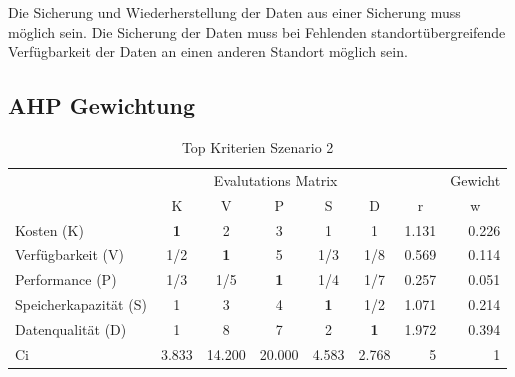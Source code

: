 Die Sicherung und Wiederherstellung der Daten aus einer Sicherung muss möglich sein. Die Sicherung der Daten muss bei Fehlenden standortübergreifende Verfügbarkeit der Daten an einen anderen Standort möglich sein.



\subsection{AHP Gewichtung}
\begin{table}[htbp]
\caption{Top Kriterien Szenario 2}
\begin{tabular}{|l|c|c|c|c|c|r|r|}
\hline
\multicolumn{ 1}{|c|}{} & \multicolumn{ 5}{c|}{Evalutations Matrix} & \multicolumn{1}{l|}{} & \multicolumn{1}{l|}{Gewicht} \\ \cline{ 2- 8}
\multicolumn{ 1}{|c|}{} & K & V & P & S & D & \multicolumn{1}{c|}{r} & \multicolumn{1}{c|}{w} \\ \hline
Kosten (K) & \textbf{1} & 2 & 3 & 1 & 1 & 1.131 & 0.226 \\ \hline
Verfügbarkeit (V) &  1/2 & \textbf{1} & 5 &  1/3 &  1/8 & 0.569 & 0.114 \\ \hline
Performance (P) &  1/3 &  1/5 & \textbf{1} &  1/4 &  1/7 & 0.257 & 0.051 \\ \hline
Speicherkapazität (S) & 1 & 3 & 4 & \textbf{1} &  1/2 & 1.071 & 0.214 \\ \hline
Datenqualität (D) & 1 & 8 & 7 & 2 & \textbf{1} & 1.972 & 0.394 \\ \hline  \hline
Ci & \multicolumn{1}{r|}{3.833} & \multicolumn{1}{r|}{14.200} & \multicolumn{1}{r|}{20.000} & \multicolumn{1}{r|}{4.583} & \multicolumn{1}{r|}{2.768} & 5 & 1 \\ \hline 
\end{tabular}
\label{AHPTopKriterienS2}
\end{table}



